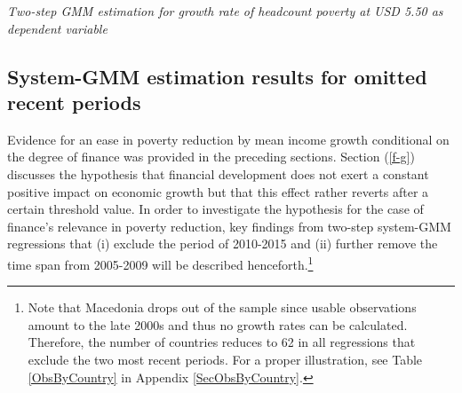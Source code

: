 \documentclass[12pt, a4paper]{article}
\begin{document}
\begin{table}[htbp]
\begin{threeparttable}
\begin{tablenotes}
		\end{tablenotes}
	\end{threeparttable}
	\caption[Two-Step System-GMM Estimation Results for Headcount Poverty at USD 5.50]{\textit{Two-step GMM estimation for growth rate of headcount poverty at USD 5.50 as dependent variable}}
	\label{2GMM550full}
\end{table}

\newpage


\subsection{System-GMM estimation results for omitted recent periods}

Evidence for an ease in poverty reduction by mean income growth conditional on the degree of finance was provided in the preceding sections. Section (\ref{f-g}) discusses the hypothesis that financial development does not exert a constant positive impact on economic growth but that this effect rather reverts after a certain threshold value.
In order to investigate the hypothesis for the case of finance's relevance in poverty reduction, key findings from two-step system-GMM regressions that (i) exclude the period of 2010-2015 and (ii) further remove the time span from 2005-2009 will be described henceforth.\footnote{Note that Macedonia drops out of the sample since usable observations amount to the late 2000s and thus no growth rates can be calculated. Therefore, the number of countries reduces to 62 in all regressions that exclude the two most recent periods. For a proper illustration, see Table \ref{ObsByCountry} in Appendix \ref{SecObsByCountry}.}
\end{document}
